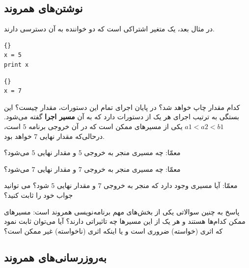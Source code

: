 \documentclass{book}
\begin{document}
\subsection {نوشتن‌های همروند}
در مثال بعد،  یک متغیر اشتراکی است که دو خواننده به آن دسترسی دارند. 

\begin{latin}
\begin{minipage}[t]{2in}
\begin{latin}
\begin{lstlisting}[title=\rl{نخ \lr{A}}]{}
x = 5
print x
\end{lstlisting}
\end{latin}
\end{minipage}
\hfill
\begin{minipage}[t]{2in}
\begin{latin}
\begin{lstlisting}[title=\rl{نخ \lr{B}}]{}
x = 7
\end{lstlisting}
\end{latin}
\end{minipage}
\end{latin}

کدام مقدار  چاپ خواهد شد؟ در پایان اجرای تمام این دستورات، مقدار  چیست؟ 
این بستگی به ترتیب اجرای هر یک از دستورات دارد که به آن \textbf{مسیر اجرا} گفته می‌شود. 
$a1 < a2 < b1$ یکی از مسیرهای ممکن است که در آن خروجی برنامه 
\texttt{$5$} است، درحالی‌که مقدار نهایی \texttt{$7$} خواهد بود. 


معمّا: چه مسیری منجر به خروجی \texttt{$5$} و مقدار نهایی \texttt{$5$} می‌شود؟

معمّا: چه مسیری منجر به خروجی \texttt{$7$} و مقدار نهایی \texttt{$7$} می‌شود؟

معمّا: آیا مسیری وجود دارد که منجر به خروجی \texttt{$7$} و مقدار نهایی \texttt{$5$} شود؟ می توانید جواب خود را ثابت کنید؟

پاسخ به چنین سوالاتی یکی از بخش‌های مهم برنامه‌نویسی همروند است: مسیرهای ممکن کدام‌ها هستند و هر یک از این مسیرها چه تاثیراتی دارند؟ 
    آیا می‌توان ثابت نمود که اثری (خواسته) ضروری است و یا اینکه اثری (ناخواسته) غیر ممکن است؟


\subsection {به‌روزرسانی‌های همروند}
\end{document}
